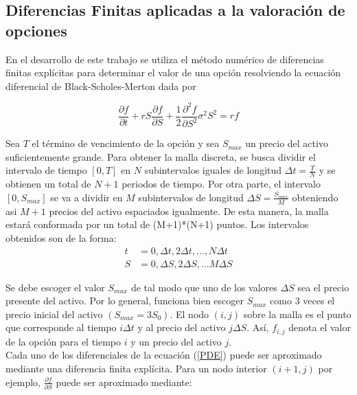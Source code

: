 \documentclass{article}
\begin{document}
\subsection{Diferencias Finitas aplicadas a la valoración de opciones}

En el desarrollo de este trabajo se utiliza el método numérico de diferencias finitas explícitas para
determinar el valor de una opción resolviendo la ecuación diferencial de Black-Scholes-Merton dada
por 

\begin{equation}
  \label{PDE}
  \frac{\partial{f}}{\partial{t}} + rS\frac{\partial{f}}{\partial{S}} +
  \frac{1}{2}\frac{\partial^2{f}}{\partial{S^2}}\sigma^2{S}^2 = rf 
\end{equation}

\smallskip

Sea $T$ el término de vencimiento de la opción y sea $S_{max}$ un precio del activo suficientemente
grande. Para obtener la malla discreta, se busca dividir el intervalo de tiempo $[0,T]$ en $N$
subintervalos iguales de longitud $\Delta t = \frac{T}{N}$ y se obtienen un total de $N+1$ periodos de tiempo. Por otra parte, el intervalo $[0,S_{max}]$ se va a dividir en $M$ subintervalos de longitud $\Delta S = \frac{S_{max}}{M}$ obteniendo asi $M+1$ precios del activo espaciados igualmente. De esta manera, la malla estará conformada por un total de (M+1)*(N+1) puntos. Los intervalos obtenidos son de la forma:
\begin{align*}
    t &= 0, \Delta t, 2 \Delta t, \ldots, N \Delta t \\
    S &= 0, \Delta S, 2 \Delta S, \ldots M \Delta S
\end{align*}

Se debe escoger el valor $S_{max}$ de tal modo que uno de los valores $\Delta S$ sea el precio presente del activo. Por lo general, funciona bien escoger $S_{max}$ como $3$ veces el precio inicial del activo $(S_{max} = 3S_0)$. El nodo $(i,j)$ sobre la malla es el punto que corresponde al tiempo $i\Delta t$ y al precio del activo $j\Delta S $. Así, $f_{i,j}$ denota el valor de la opción para el tiempo $i$ y un precio del activo $j$. \\

Cada uno de los diferenciales de la ecuación (\ref{PDE}) puede ser aproximado mediante una diferencia finita explícita. Para un nodo interior $(i+1,j)$ por ejemplo, $\frac{\partial{f}}{\partial{S}}$ puede ser aproximado mediante: \\
\end{document}
